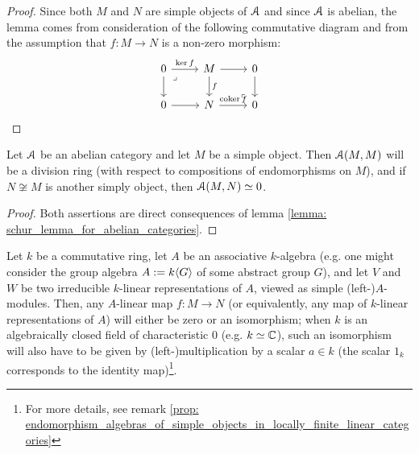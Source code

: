                 \begin{proof}
                    Since both $M$ and $N$ are simple objects of $\mathcal{A}$ and since $\mathcal{A}$ is abelian, the lemma comes from consideration of the following commutative diagram and from the assumption that $f: M \to N$ is a non-zero morphism:
                        $$
                            \begin{tikzcd}
                            	0 & M & 0 \\
                            	0 & N & 0
                            	\arrow["f", from=1-2, to=2-2]
                            	\arrow[from=1-1, to=2-1]
                            	\arrow[from=2-1, to=2-2]
                            	\arrow["{\ker f}", from=1-1, to=1-2]
                            	\arrow[from=1-2, to=1-3]
                            	\arrow["{\coker f}", from=2-2, to=2-3]
                            	\arrow[from=1-3, to=2-3]
                            	\arrow["\lrcorner"{anchor=center, pos=0.125, rotate=180}, draw=none, from=2-3, to=1-2]
                            	\arrow["\lrcorner"{anchor=center, pos=0.125}, draw=none, from=1-1, to=2-2]
                            \end{tikzcd}
                        $$
                \end{proof}
            \begin{corollary} \label{coro: endomorphism_algebras_of_simple_objects_in_abelian_categories}
                Let $\mathcal{A}$ be an abelian category and let $M$ be a simple object. Then $\mathcal{A}(M, M)$ will be a division ring (with respect to compositions of endomorphisms on $M$), and if $N \not \cong M$ is another simply object, then $\mathcal{A}(M, N) \simeq 0$. 
            \end{corollary}
                \begin{proof}
                    Both assertions are direct consequences of lemma \ref{lemma: schur_lemma_for_abelian_categories}.
                \end{proof}
            \begin{example}
                Let $k$ be a commutative ring, let $A$ be an associative $k$-algebra (e.g. one might consider the group algebra $A := k\langle G\rangle$ of some abstract group $G$), and let $V$ and $W$ be two irreducible $k$-linear representations of $A$, viewed as simple (left-)$A$-modules. Then, any $A$-linear map $f: M \to N$ (or equivalently, any map of $k$-linear representations of $A$) will either be zero or an isomorphism; when $k$ is an algebraically closed field of characteristic $0$ (e.g. $k \simeq \mathbb{C}$), such an isomorphism will also have to be given by (left-)multiplication by a scalar $a \in k$ (the scalar $1_k$ corresponds to the identity map)\footnote{For more details, see remark \ref{prop: endomorphism_algebras_of_simple_objects_in_locally_finite_linear_categories}}.
            \end{example}
                
